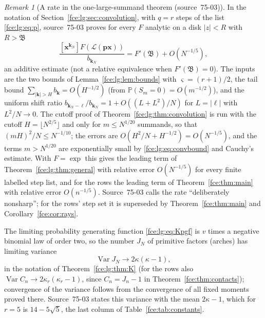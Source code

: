 \documentclass[11pt,a4paper]{article}
\numberwithin{equation}{section}
\theoremstyle{definition}\newtheorem{definition}[theorem]{Definition}
\theoremstyle{remark}\newtheorem{remark}[theorem]{Remark}
\newcommand{\Lcal}{\mathcal L}
\newcommand{\Prob}{\mathbb P}
\newcommand{\Var}{\operatorname{Var}}
\newcommand{\Bmass}{\mathfrak B}
\begin{document}
\begin{remark}[A rate in the one-large-summand theorem (source~75-03)]\label{fce:kk:rem:rate}
In the notation of Section~\ref{fce:lg:sec:convolution}, with $q=r$ steps of
the list \eqref{fce:lg:eq:p}, source~75-03 proves for every $F$ analytic on
a disk $|z|<R$ with $R>\Bmass$
\begin{equation}\label{fce:kk:eq:rate}
 \frac{[\boldsymbol x^{\boldsymbol k_N}]F(\Lcal(\boldsymbol p\boldsymbol x))}{b_{\boldsymbol k_N}}
 =F'(\Bmass)+O(N^{-1/5}),
\end{equation}
an additive estimate (not a relative equivalence when $F'(\Bmass)=0$). The
inputs are the two bounds of Lemma~\ref{fce:lg:lem:bounds} with
$\varsigma=(r+1)/2$, the tail bound
$\sum_{|\boldsymbol k|>H}b_{\boldsymbol k}=O(H^{-1/2})$ (from
$\Prob(S_m=0)=O(m^{-1/2})$), and the uniform shift ratio
$b_{\boldsymbol k_N-\boldsymbol\ell}/b_{\boldsymbol k_N}
=1+O((L+L^2)/N)$ for $L=|\boldsymbol\ell|$ with $L^2/N\to0$. The cutoff
proof of Theorem~\ref{fce:lg:thm:convolution} is run with the cutoff
$H=\lfloor N^{2/5}\rfloor$ and only for $m\le N^{1/20}$ summands, so that
$(mH)^2/N\le N^{-1/10}$; the errors are $O(H^2/N+H^{-1/2})=O(N^{-1/5})$, and
the terms $m>N^{1/20}$ are exponentially small by
\eqref{fce:lg:eq:convbound} and Cauchy's estimate. With $F=\exp$ this gives
the leading term of Theorem~\ref{fce:lg:thm:general} with relative error
$O(N^{-1/5})$ for every finite labelled step list, and for the rows the
leading term of Theorem~\ref{fce:thm:main} with relative error
$O(n^{-1/5})$. Source~75-03 calls the rate ``deliberately nonsharp''; for the
rows' step set it is superseded by Theorem~\ref{fce:thm:main} and
Corollary~\ref{fce:cor:rays}.
\end{remark}

The limiting probability generating function \eqref{fce:lg:eq:Kpgf} is
$v$ times a negative binomial law of order two, so the number $J_N$ of
primitive factors (arches) has limiting variance
\begin{equation}\label{fce:kk:eq:variance}
 \Var J_N\longrightarrow 2\kappa(\kappa-1),
\end{equation}
in the notation of Theorem~\ref{fce:lg:thm:K} (for the rows also
$\Var C_n\to2\kappa_r(\kappa_r-1)$, since $C_n=J_n-1$ in
Theorem~\ref{fce:thm:contacts});
convergence of the variance follows from the convergence of all fixed
moments proved there. Source~75-03 states this variance with the mean
$2\kappa-1$, which for $r=5$ is $14-5\sqrt5$, the last column of
Table~\ref{fce:tab:constants}.
\end{document}
